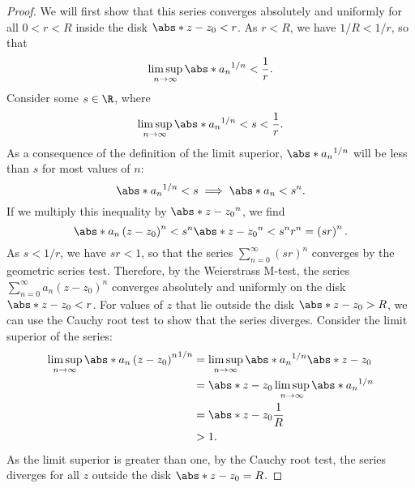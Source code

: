 \documentclass{article}
\begin{document}
\begin{proof}
    We will first show that this series converges absolutely
    and uniformly for all \(0 < r < R\) inside the disk
    \(\abs*{z - z_0} < r\). As \(r < R\), we have \(1 / R < 1 / r\), so
    that
    \begin{equation*}
        \limsup_{n \to \infty} \abs*{a_n}^{1/n} < \frac{1}{r}.
    \end{equation*}
    Consider some \(s \in \R\), where
    \begin{equation*}
        \limsup_{n \to \infty} \abs*{a_n}^{1/n} < s < \frac{1}{r}.
    \end{equation*}
    As a consequence of the definition of the limit superior,
    \(\abs*{a_n}^{1/n}\) will be less than \(s\) for most values of
    \(n\):
    \begin{equation*}
        \abs*{a_n}^{1/n} < s \implies \abs*{a_n} < s^n.
    \end{equation*}
    If we multiply this inequality by \(\abs*{z - z_0}^n\), we find
    \begin{equation*}
        \abs*{a_n \left( z - z_0 \right)^n} < s^n \abs*{z - z_0}^n < s^n r^n = \left( s r \right)^n.
    \end{equation*}
    As \(s < 1 / r\), we have \(s r < 1\), so that the series
    \(\sum_{n = 0}^\infty \left( s r \right)^n\) converges by the
    geometric series test. Therefore, by the Weierstrass M-test, the
    series \(\sum_{n = 0}^\infty a_n \left( z - z_0 \right)^n\)
    converges absolutely and uniformly on the disk
    \(\abs*{z - z_0} < r\).
    For values of \(z\) that lie outside the disk \(\abs*{z - z_0} >
    R\), we can use the Cauchy root test to show that the series
    diverges. Consider the limit superior of the series:
    \begin{align*}
        \limsup_{n \to \infty} \abs*{a_n \left( z - z_0 \right)^n}^{1/n} & = \limsup_{n \to \infty} \abs*{a_n}^{1/n} \abs*{z - z_0} \\
                                                                         & = \abs*{z - z_0} \limsup_{n \to \infty} \abs*{a_n}^{1/n} \\
                                                                         & = \abs*{z - z_0} \frac{1}{R}                             \\
                                                                         & > 1.
    \end{align*}
    As the limit superior is greater than one, by the Cauchy root test,
    the series diverges for all \(z\) outside the disk
    \(\abs*{z - z_0} = R\).
\end{proof}
\end{document}
